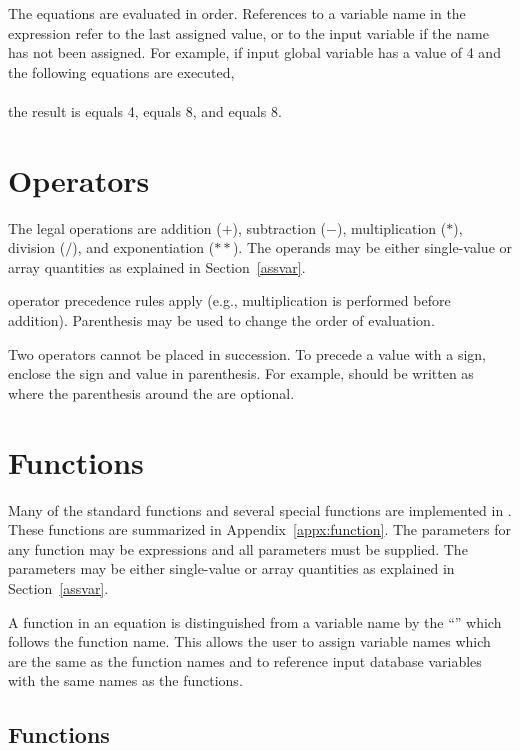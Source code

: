 The equations are evaluated in order. References to a variable name in
the expression refer to the last assigned value, or to the input
variable if the name has not been assigned. For example, if input global
variable  has a value of 4 and the following equations are
executed,
\cenlinesbegin
{} \\
 \\
\cenlinesend
the result is  equals 4,  equals 8, and  equals
8.

\section{Operators}

The legal operations are addition ($+$), subtraction ($-$),
multiplication ($*$), division ($/$), and exponentiation ($**$). The
operands may be either single-value or array quantities as explained in
Section~\ref{assvar}.

 operator precedence rules apply (e.g., multiplication is
performed before addition). Parenthesis may be used to change the order
of evaluation.

Two operators cannot be placed in succession. To precede a value with a
sign, enclose the sign and value in parenthesis. For example,
\cenlinesbegin
{}
\cenlinesend
should be written as
\cenlinesbegin
{}
\cenlinesend
where the parenthesis around the  are optional.

\section{Functions}

Many of the standard  functions and several special
functions are implemented in \caps{\PROGRAM}. 
These functions are summarized in Appendix~\ref{appx:function}.
The parameters for any
function may be expressions and all parameters must be supplied. The
parameters may be either single-value or array quantities as explained
in Section~\ref{assvar}.

A function in an equation is distinguished from a variable name by the
``\cmd{(}'' which follows the function name. This allows the user to
assign variable names which are the same as the function names and to
reference input database variables with the same names as the functions.

\subsection*{ Functions}

